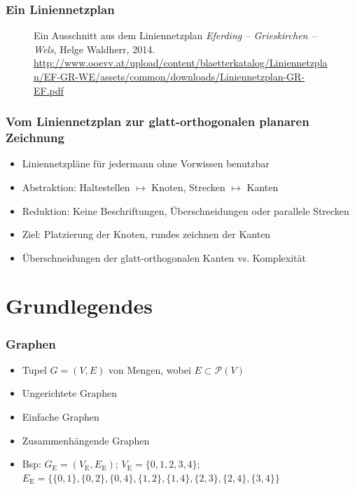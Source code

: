\documentclass{beamer}
\begin{document}
\begin{frame}
  \frametitle{Ein Liniennetzplan}
  \begin{figure}[h]
    \centering
    \caption{Ein Ausschnitt aus dem Liniennetzplan \emph{Eferding -- Grieskirchen -- Wels}, Helge Waldherr, 2014. \footnotesize{\url{http://www.ooevv.at/upload/content/blaetterkatalog/Liniennetzplan/EF-GR-WE/assets/common/downloads/Liniennetzplan-GR-EF.pdf}}}
    \label{fig:liniennetzplan}
  \end{figure}
\end{frame}

\begin{frame}
  \frametitle{Vom Liniennetzplan zur glatt-orthogonalen planaren Zeichnung}
  \begin{itemize}[<+->]
    \item Liniennetzpläne für jedermann ohne Vorwissen benutzbar
    \item Abstraktion: Haltestellen $\mapsto$ Knoten, Strecken $\mapsto$ Kanten
    \item Reduktion: Keine Beschriftungen, Überschneidungen oder parallele Strecken
    \item Ziel: Platzierung der Knoten, rundes zeichnen der Kanten
    \item Überschneidungen der glatt-orthogonalen Kanten vs. Komplexität
  \end{itemize}
\end{frame}


\section{Grundlegendes}
\frame{\tableofcontents[currentsection]}

\begin{frame}
  \frametitle{Graphen}
  \begin{itemize}[<+->]
    \item Tupel $G = (V, E)$ von Mengen, wobei $E \subset \mathcal{P}(V)$
    \item Ungerichtete Graphen
    \item Einfache Graphen
    \item Zusammenhängende Graphen
    \item Bsp: $G_\text{E} = (V_\text{E}, E_\text{E})$; $V_\text{E} = \{0, 1, 2, 3, 4\}$; $E_\text{E} = \{\{0, 1\}, \{0, 2\}, \{0, 4\}, \{1, 2\}, \{1, 4\}, \{2, 3\}, \{2, 4\}, \{3, 4\}\}$

  \end{itemize}
\end{frame}
\end{document}
